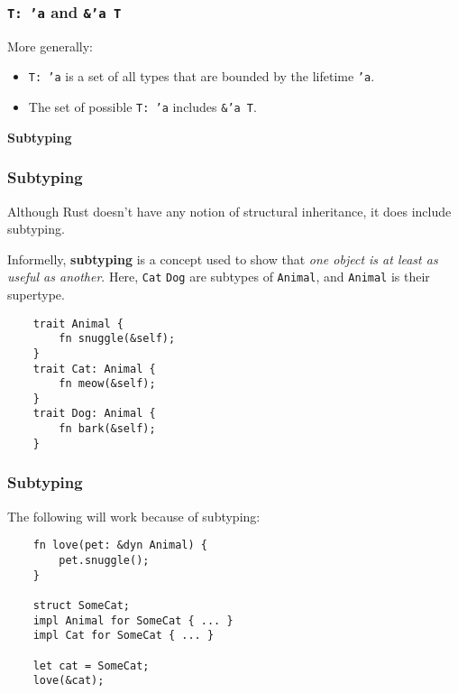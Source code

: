 \documentclass[aspectratio=1610,t]{beamer}
\begin{document}

\begin{frame}[fragile]
\frametitle{\texttt{T: 'a} and \texttt{\&'a T}}
More generally:

\begin{itemize}
    \item<1-> \texttt{T: 'a} is a set of all types that are bounded by the lifetime \texttt{'a}.
    \item<2-> The set of possible \texttt{T: 'a} includes \texttt{\&'a T}.
\end{itemize}
\end{frame}


\begin{frame}[c]
\centering\Huge\textbf{Subtyping}
\end{frame}


\begin{frame}[fragile]
\frametitle{Subtyping}
Although Rust doesn't have any notion of structural inheritance, it does include subtyping. 

Informelly, \textbf{subtyping} is a concept used to show that \textit{one object is at least as useful as another}. Here, \texttt{Cat} \texttt{Dog} are subtypes of \texttt{Animal}, and \texttt{Animal} is their supertype.

\begin{verbatim}
    trait Animal {
        fn snuggle(&self);
    }
    trait Cat: Animal {
        fn meow(&self);
    }
    trait Dog: Animal {
        fn bark(&self);
    }
\end{verbatim}
\end{frame}


\begin{frame}[fragile]
\frametitle{Subtyping}
The following will work because of subtyping:

\begin{verbatim}
    fn love(pet: &dyn Animal) {
        pet.snuggle();
    }

    struct SomeCat;
    impl Animal for SomeCat { ... }
    impl Cat for SomeCat { ... }

    let cat = SomeCat;
    love(&cat);
\end{verbatim}
\end{frame}
\end{document}

